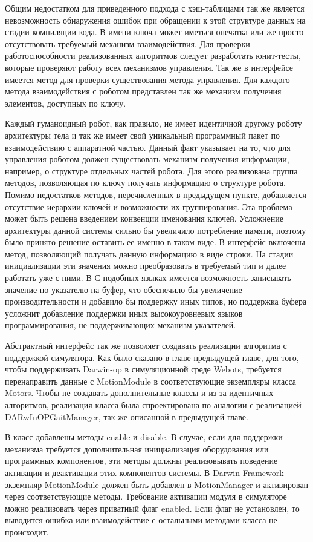 Общим недостатком для приведенного подхода с хэш-таблицами так же является невозможность обнаружения ошибок при обращении к этой структуре данных на стадии компиляции кода. В имени ключа может иметься опечатка или же просто отсутствовать требуемый механизм взаимодействия. Для проверки работоспособности реализованных алгоритмов следует разработать юнит-тесты, которые проверяют работу всех механизмов управления. Так же в интерфейсе имеется метод для проверки существования метода управления. Для каждого метода взаимодействия с роботом представлен так же механизм получения элементов, доступных по ключу.

Каждый гуманоидный робот, как правило, не имеет идентичной другому роботу архитектуры тела и так же имеет свой уникальный программный пакет по взаимодействию с аппаратной частью. Данный факт указывает на то, что для управления роботом должен существовать механизм получения информации, например, о структуре отдельных частей робота. Для этого реализована группа методов, позволяющая по ключу получать информацию о структуре робота. Помимо недостатков методов, перечисленных в предыдущем пункте, добавляется отсутствие иерархии ключей и возможности их группирования. Эта проблема может быть решена введением конвенции именования ключей. Усложнение архитектуры данной системы сильно бы увеличило потребление памяти, поэтому было принято решение оставить ее именно в таком виде. В интерфейс включены метод, позволяющий получать данную информацию в виде строки. На стадии инициализации эти значения можно преобразовать в требуемый тип и далее работать уже с ними. В С-подобных языках имеется возможность записывать значение по указателю на буфер, что обеспечило бы увеличение производительности и добавило бы поддержку иных типов, но поддержка буфера усложнит добавление поддержки иных высокоуровневых языков программирования, не поддерживающих механизм указателей.

Абстрактный интерфейс так же позволяет создавать реализации алгоритма с поддержкой симулятора. Как было сказано в главе предыдущей главе, для того, чтобы поддерживать Darwin-op в симуляционной среде Webots, требуется перенаправить данные с MotionModule в соответствующие экземпляры класса Motors. Чтобы не создавать дополнительные классы и из-за идентичных алгоритмов, реализация класса была спроектирована по аналогии с реализацией DARwInOPGaitManager, так же описанной в предыдущей главе.

В класс добавлены методы enable и disable. В случае, если для поддержки механизма требуется дополнительная инициализация оборудования или программных компонентов, эти методы должны реализовывать поведение активации и деактивации этих компонентов системы. В Darwin Framework экземпляр MotionModule должен быть добавлен в MotionManager и активирован через соответствующие методы. Требование активации модуля в симуляторе можно реализовать через приватный флаг enabled. Если флаг не установлен, то выводится ошибка или взаимодействие с остальными методами класса не происходит.

